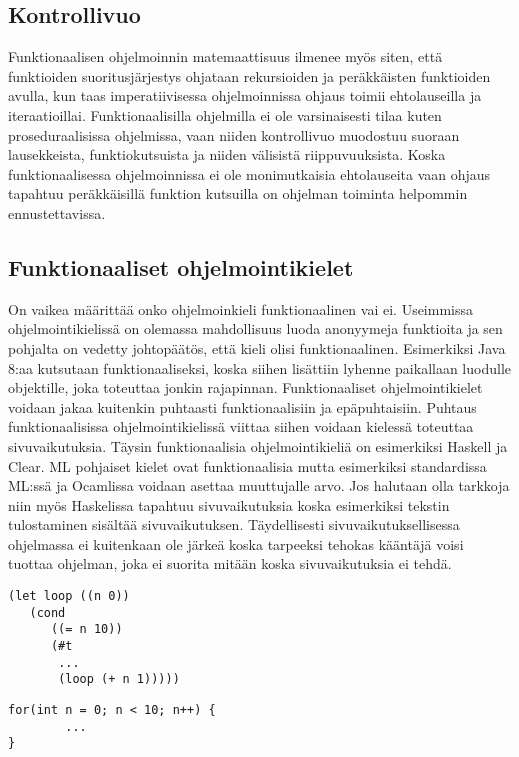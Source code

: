 \documentclass[12pt]{article}
\begin{document}
\subsection{Kontrollivuo}
Funktionaalisen ohjelmoinnin matemaattisuus ilmenee myös siten, että funktioiden suoritusjärjestys ohjataan rekursioiden ja peräkkäisten funktioiden avulla, kun taas imperatiivisessa ohjelmoinnissa ohjaus toimii ehtolauseilla ja iteraatioillai. Funktionaalisilla ohjelmilla ei ole varsinaisesti tilaa kuten proseduraalisissa ohjelmissa, vaan niiden kontrollivuo muodostuu suoraan lausekkeista, funktiokutsuista ja niiden välisistä riippuvuuksista. Koska funktionaalisessa ohjelmoinnissa ei ole monimutkaisia ehtolauseita vaan ohjaus tapahtuu peräkkäisillä funktion kutsuilla on ohjelman toiminta helpommin ennustettavissa.


\subsection{Funktionaaliset ohjelmointikielet}
On vaikea määrittää onko ohjelmoinkieli funktionaalinen vai ei. Useimmissa ohjelmointikielissä on olemassa mahdollisuus luoda anonyymeja funktioita ja sen pohjalta on vedetty johtopäätös, että kieli olisi funktionaalinen. Esimerkiksi Java 8:aa kutsutaan funktionaaliseksi, koska siihen lisättiin lyhenne paikallaan luodulle objektille, joka toteuttaa jonkin rajapinnan.
Funktionaaliset ohjelmointikielet voidaan jakaa kuitenkin puhtaasti funktionaalisiin ja epäpuhtaisiin. Puhtaus funktionaalisissa ohjelmointikielissä viittaa siihen voidaan kielessä toteuttaa sivuvaikutuksia. 
Täysin funktionaalisia ohjelmointikieliä on esimerkiksi Haskell ja Clear. ML pohjaiset kielet ovat funktionaalisia mutta esimerkiksi standardissa ML:ssä ja Ocamlissa voidaan asettaa muuttujalle arvo.
Jos halutaan olla tarkkoja niin myös Haskelissa tapahtuu sivuvaikutuksia koska esimerkiksi tekstin tulostaminen sisältää sivuvaikutuksen. Täydellisesti sivuvaikutuksellisessa ohjelmassa ei kuitenkaan ole järkeä koska tarpeeksi tehokas kääntäjä voisi tuottaa ohjelman, joka ei suorita mitään koska sivuvaikutuksia ei tehdä.



\begin{lstlisting}
(let loop ((n 0))
   (cond
      ((= n 10))
      (#t
       ...
       (loop (+ n 1)))))      
\end{lstlisting}
\begin{lstlisting}
for(int n = 0; n < 10; n++) {
        ...
}
\end{lstlisting}
\end{document}
